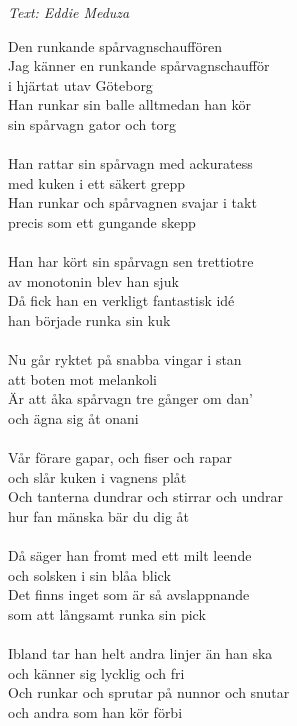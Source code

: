 {\footnotesize\textit{Text: Eddie Meduza}}\par
\vspace{10pt}
Den runkande spårvagnschauffören\\
Jag känner en runkande spårvagnschaufför\\
i hjärtat utav Göteborg\\
Han runkar sin balle alltmedan han kör\\
sin spårvagn gator och torg\\
\\
Han rattar sin spårvagn med ackuratess\\
med kuken i ett säkert grepp\\
Han runkar och spårvagnen svajar i takt\\
precis som ett gungande skepp\\
\\
Han har kört sin spårvagn sen trettiotre\\
av monotonin blev han sjuk\\
Då fick han en verkligt fantastisk idé\\
han började runka sin kuk\\
\\
Nu går ryktet på snabba vingar i stan\\
att boten mot melankoli\\
Är att åka spårvagn tre gånger om dan’\\
och ägna sig åt onani\\
\\
Vår förare gapar, och fiser och rapar\\
och slår kuken i vagnens plåt\\
Och tanterna dundrar och stirrar och undrar\\
hur fan mänska bär du dig åt\\
\\
Då säger han fromt med ett milt leende\\
och solsken i sin blåa blick\\
Det finns inget som är så avslappnande\\
som att långsamt runka sin pick\\
\\
Ibland tar han helt andra linjer än han ska\\
och känner sig lycklig och fri\\
Och runkar och sprutar på nunnor och snutar\\
och andra som han kör förbi\\
